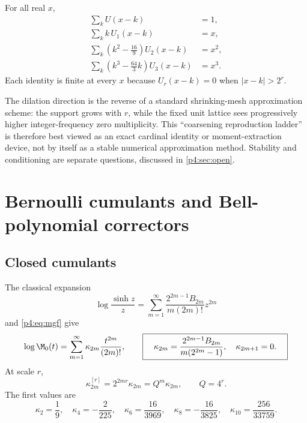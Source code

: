 \documentclass[11pt]{article}
\numberwithin{equation}{section}
\theoremstyle{definition}
\theoremstyle{remark}
\begin{document}
\begin{example}
For all real $x$,
\begin{align}
 \sum_kU(x-k)&=1,\\
 \sum_kk\,U_1(x-k)&=x,\\
 \sum_k\left(k^2-\frac{16}{9}\right)U_2(x-k)&=x^2,\\
 \sum_k\left(k^3-\frac{64}{3}k\right)U_3(x-k)&=x^3.
 \label{p4:eq:first-reproductions}
\end{align}
Each identity is finite at every $x$ because $U_r(x-k)=0$ when $|x-k|>2^r$.
\end{example}

\begin{corpusdeductionbox}
The dilation direction is the reverse of a standard shrinking-mesh approximation scheme: the support grows with $r$, while the fixed unit lattice sees progressively higher integer-frequency zero multiplicity.  This ``coarsening reproduction ladder'' is therefore best viewed as an exact cardinal identity or moment-extraction device, not by itself as a stable numerical approximation method.  Stability and conditioning are separate questions, discussed in \cref{p4:sec:open}.
\end{corpusdeductionbox}

\section{Bernoulli cumulants and Bell-polynomial correctors}
\label{p4:sec:bernoulli-bell}

\subsection{Closed cumulants}
The classical expansion
\begin{equation}
 \log\frac{\sinh z}{z}
 =\sum_{m=1}^{\infty}
 \frac{2^{2m-1}B_{2m}}{m(2m)!}z^{2m}
 \label{p4:eq:logsinh}
\end{equation}
and \eqref{p4:eq:mgf} give
\begin{equation}
 \log\M_0(t)=\sum_{m=1}^{\infty}\kappa_{2m}\frac{t^{2m}}{(2m)!},
 \qquad
 \boxed{\quad
 \kappa_{2m}=\frac{2^{2m-1}B_{2m}}{m(2^{2m}-1)},
 \quad \kappa_{2m+1}=0.
 \quad}
 \label{p4:eq:cumulants}
\end{equation}
At scale $r$,
\begin{equation}
 \kappa_{2m}^{[r]}=2^{2mr}\kappa_{2m}=Q^m\kappa_{2m},
 \qquad Q=4^r.
 \label{p4:eq:scaled-cumulants}
\end{equation}
The first values are
\begin{equation}
 \kappa_2=\frac19,
 \quad \kappa_4=-\frac2{225},
 \quad \kappa_6=\frac{16}{3969},
 \quad \kappa_8=-\frac{16}{3825},
 \quad \kappa_{10}=\frac{256}{33759}.
 \label{p4:eq:cumulant-values}
\end{equation}
\end{document}
